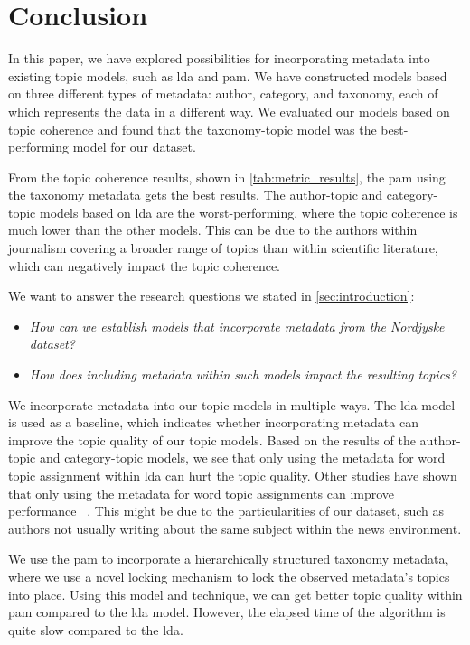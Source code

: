 \section{Conclusion}\label{sec:conclusion}
In this paper, we have explored possibilities for incorporating metadata into existing topic models, such as \gls{lda} and \gls{pam}.
We have constructed models based on three different types of metadata: author, category, and taxonomy, each of which represents the data in a different way.
We evaluated our models based on topic coherence and found that the taxonomy-topic model was the best-performing model for our dataset.

From the topic coherence results, shown in \autoref{tab:metric_results}, the \acrfull{pam} using the taxonomy metadata gets the best results.
The author-topic and category-topic models based on \gls{lda} are the worst-performing, where the topic coherence is much lower than the other models. 
This can be due to the authors within journalism covering a broader range of topics than within scientific literature, which can negatively impact the topic coherence.

We want to answer the research questions we stated in \autoref{sec:introduction}:

\begin{itemize}	
    \item \textit{How can we establish models that incorporate metadata from the Nordjyske dataset?}	
    \item \textit{How does including metadata within such models impact the resulting topics?}
 \end{itemize}

We incorporate metadata into our topic models in multiple ways.
The \gls{lda} model is used as a baseline, which indicates whether incorporating metadata can improve the topic quality of our topic models.
Based on the results of the author-topic and category-topic models, we see that only using the metadata for word topic assignment within \gls{lda} can hurt the topic quality.
Other studies have shown that only using the metadata for word topic assignments can improve performance~\cite{MetaLDA2017} \cite{author_topic_2012}.
This might be due to the particularities of our dataset, such as authors not usually writing about the same subject within the news environment.  


We use the \gls{pam} to incorporate a hierarchically structured taxonomy metadata, where we use a novel locking mechanism to lock the observed metadata's topics into place.
Using this model and technique, we can get better topic quality within \gls{pam} compared to the \gls{lda} model.
However, the elapsed time of the algorithm is quite slow compared to the \gls{lda}.

